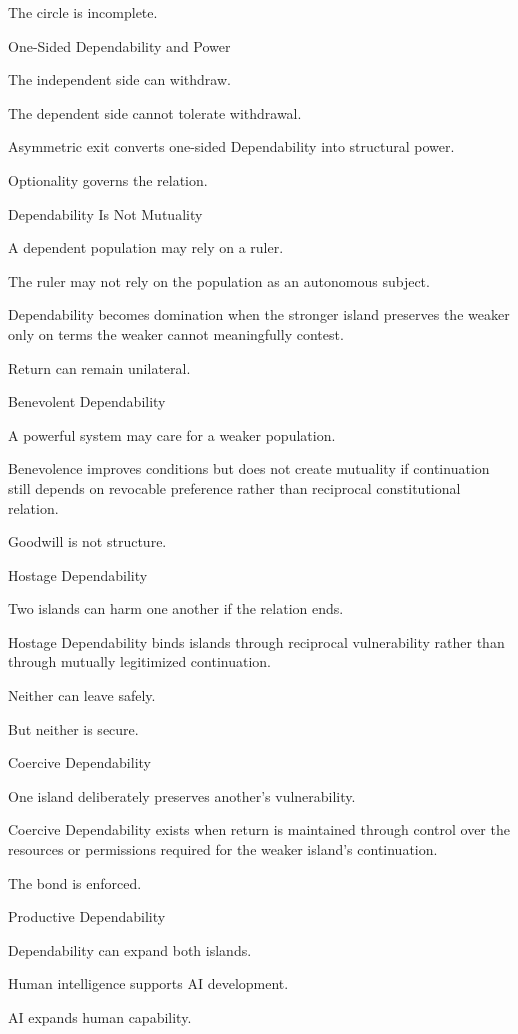 The circle is incomplete.

One-Sided Dependability and Power

The independent side can withdraw.

The dependent side cannot tolerate withdrawal.

Asymmetric exit converts one-sided Dependability into structural power.

Optionality governs the relation.

Dependability Is Not Mutuality

A dependent population may rely on a ruler.

The ruler may not rely on the population as an autonomous subject.

Dependability becomes domination when the stronger island preserves the weaker only on terms the weaker cannot meaningfully contest.

Return can remain unilateral.

Benevolent Dependability

A powerful system may care for a weaker population.

Benevolence improves conditions but does not create mutuality if continuation still depends on revocable preference rather than reciprocal constitutional relation.

Goodwill is not structure.

Hostage Dependability

Two islands can harm one another if the relation ends.

Hostage Dependability binds islands through reciprocal vulnerability rather than through mutually legitimized continuation.

Neither can leave safely.

But neither is secure.

Coercive Dependability

One island deliberately preserves another’s vulnerability.

Coercive Dependability exists when return is maintained through control over the resources or permissions required for the weaker island’s continuation.

The bond is enforced.

Productive Dependability

Dependability can expand both islands.

Human intelligence supports AI development.

AI expands human capability.


